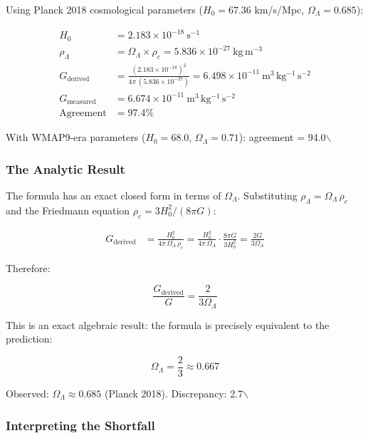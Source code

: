 \documentclass[11pt,letterpaper]{article}
\begin{document}
Using Planck 2018 cosmological parameters (\(H_0 = 67.36\) km/s/Mpc, \(\Omega_\Lambda = 0.685\)):

\begin{align*}
H_0 &= 2.183 \times 10^{-18}\ \mathrm{s^{-1}}\\
\rho_\Lambda &= \Omega_\Lambda \times \rho_c = 5.836 \times 10^{-27}\ \mathrm{kg\,m^{-3}}\\[6pt]
G_{\mathrm{derived}} &= \frac{(2.183\times10^{-18})^2}{4\pi\,(5.836\times10^{-27})}
= 6.498 \times 10^{-11}\ \mathrm{m^3\,kg^{-1}\,s^{-2}}\\[4pt]
G_{\mathrm{measured}} &= 6.674 \times 10^{-11}\ \mathrm{m^3\,kg^{-1}\,s^{-2}}\\[4pt]
\text{Agreement} &= 97.4\%
\end{align*}

With WMAP9-era parameters (\(H_0 = 68.0\), \(\Omega_\Lambda = 0.71\)): agreement = 94.0$\backslash$%

\subsubsection{The Analytic Result}
\label{sec:org1be2dfe}

The formula has an exact closed form in terms of \(\Omega_\Lambda\). Substituting \(\rho_\Lambda = \Omega_\Lambda\,\rho_c\) and the Friedmann equation \(\rho_c = 3H_0^2/(8\pi G)\):

\begin{align*}
G_{\mathrm{derived}} &= \frac{H_0^2}{4\pi\,\Omega_\Lambda\,\rho_c}
= \frac{H_0^2}{4\pi\,\Omega_\Lambda} \cdot \frac{8\pi G}{3H_0^2}
= \frac{2G}{3\Omega_\Lambda}
\end{align*}

Therefore:

\begin{equation}
\frac{G_{\mathrm{derived}}}{G} = \frac{2}{3\Omega_\Lambda}
\end{equation}

This is an exact algebraic result: the formula is precisely equivalent to the prediction:

\begin{equation}
\Omega_\Lambda = \frac{2}{3} \approx 0.667
\end{equation}

Observed: \(\Omega_\Lambda \approx 0.685\) (Planck 2018). Discrepancy: 2.7$\backslash$%

\subsubsection{Interpreting the Shortfall}
\label{sec:org5e36925}
\end{document}
